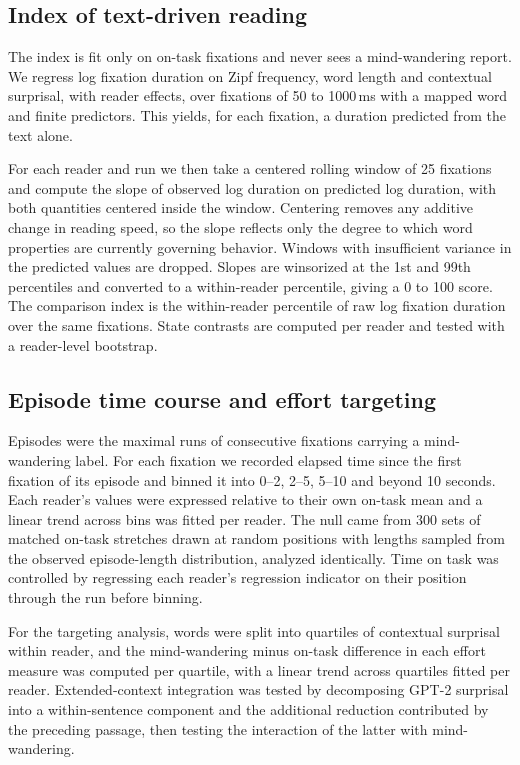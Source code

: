 \documentclass[11pt]{article}
\begin{document}
\subsection{Index of text-driven reading}

The index is fit only on on-task fixations and never sees a mind-wandering report. We regress log
fixation duration on Zipf frequency, word length and contextual surprisal, with reader effects,
over fixations of 50 to 1000\,ms with a mapped word and finite predictors. This yields, for each
fixation, a duration predicted from the text alone.

For each reader and run we then take a centered rolling window of 25 fixations and compute the
slope of observed log duration on predicted log duration, with both quantities centered inside the
window. Centering removes any additive change in reading speed, so the slope reflects only the
degree to which word properties are currently governing behavior. Windows with insufficient
variance in the predicted values are dropped. Slopes are winsorized at the 1st and 99th
percentiles and converted to a within-reader percentile, giving a 0 to 100 score. The comparison
index is the within-reader percentile of raw log fixation duration over the same fixations.
State contrasts are computed per reader and tested with a reader-level bootstrap.

\subsection{Episode time course and effort targeting}

Episodes were the maximal runs of consecutive fixations carrying a mind-wandering label. For
each fixation we recorded elapsed time since the first fixation of its episode and binned it
into 0--2, 2--5, 5--10 and beyond 10 seconds. Each reader's values were expressed relative to
their own on-task mean and a linear trend across bins was fitted per reader. The null came from
300 sets of matched on-task stretches drawn at random positions with lengths sampled from the
observed episode-length distribution, analyzed identically. Time on task was controlled by
regressing each reader's regression indicator on their position through the run before binning.

For the targeting analysis, words were split into quartiles of contextual surprisal within
reader, and the mind-wandering minus on-task difference in each effort measure was computed per
quartile, with a linear trend across quartiles fitted per reader. Extended-context integration
was tested by decomposing GPT-2 surprisal into a within-sentence component and the additional
reduction contributed by the preceding passage, then testing the interaction of the latter with
mind-wandering.
\end{document}
